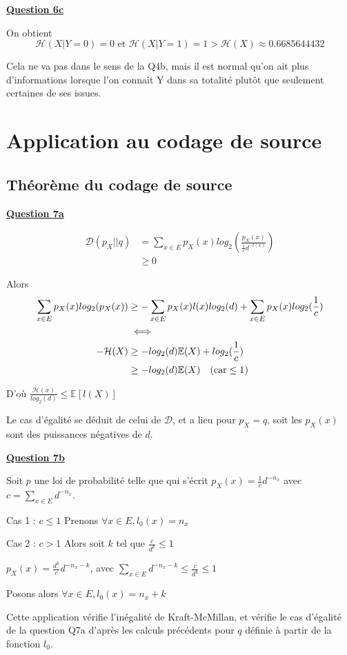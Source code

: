 \documentclass[a4paper,twoside,10pt]{article}
\renewcommand{\H}{\mathcal{H}}
\newcommand{\D}{\mathcal{D}}
\newenvironment{Q}[1]{%
\vspace{1ex}
\underline{\textbf{Question #1\\}}
\newline
}{
\vspace{2ex}
}
\begin{document}
\begin{Q}{6c}
On obtient \[\H(X|Y = 0) = 0 \text{ et } \H(X|Y = 1) = 1 > \H(X) \approx 0.6685644432 \]

Cela ne va pas dans le sens de la Q4b, mais il est normal qu'on ait plus d'informations lorsque l'on connaît Y dans sa totalité
plutôt que seulement certaines de ses issues.
\end{Q}

\section{Application au codage de source}
\subsection{Théorème du codage de source}

\begin{Q}{7a}

\begin{align*}
\D(p_X||q) &= \sum_{x \in E}p_X(x)log_2(\frac{p_X(x)}{\frac{1}{c}d^{-l(x)}}) \\
&\geq 0
\end{align*}

Alors
\begin{align*}
\sum_{x \in E}p_X(x)log_2(p_X(x)) &\geq  -\sum_{x \in E}p_X(x)l(x)log_2(d) + \sum_{x \in E}p_X(x)log_2(\frac{1}{c}) \\
 &\iff\\
-\H(X) &\geq -log_2(d) \mathbb{E}(X) + log_2(\frac{1}{c})
\\ &\geq -log_2(d) \mathbb{E}(X) \text{\quad(car} \leq 1 \textsc{)}
\end{align*}

D'où $\frac{\H(x)}{log_2(d)} \leq \mathbb{E}[l(X)]$
 
Le cas d'égalité se déduit de celui de $\D$, et a lieu pour $p_X = q$, soit les $p_X(x)$ sont des puissances négatives de $d$.
\end{Q}

\begin{Q}{7b}
Soit $p$ une loi de probabilité telle que qui s'écrit $p_X(x) = \frac{1}{c}d^{-n_x}$ avec $c = \sum_{x \in E} d^{-n_x}$.

Cas 1 : $c \leq 1$ Prenons $\forall x \in E, l_0(x) = n_x$

Cas 2 : $c > 1$ Alors soit $k$ tel que $\frac{c}{d^k} \leq 1$

$p_X(x) = \frac{d^k}{c}d^{-n_x - k}$, avec $\sum_{x \in E} d^{-n_x - k} \leq \frac{c}{d^k} \leq 1$

Posons alors $\forall x \in E, l_0(x) = n_x + k$

Cette application vérifie l'inégalité de Kraft-McMillan, et vérifie le cas d'égalité de la question Q7a d'après les calculs
précédents pour $q$ définie à partir de la fonction $l_0$.
\end{Q}
\end{document}
